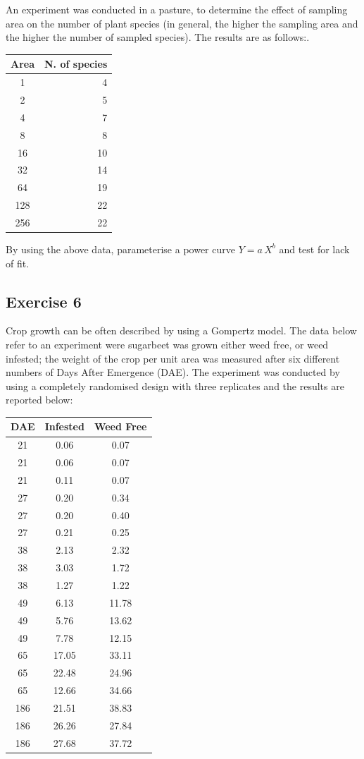 \documentclass[a4paper,12pt,oneside]{book}
\begin{document}
An experiment was conducted in a pasture, to determine the effect of sampling area on the number of plant species (in general, the higher the sampling area and the higher the number of sampled species). The results are as follows:.

\begin{longtable}[]{@{}cr@{}}
\toprule
Area & N. of species \\
\midrule
\endhead
1 & 4 \\
2 & 5 \\
4 & 7 \\
8 & 8 \\
16 & 10 \\
32 & 14 \\
64 & 19 \\
128 & 22 \\
256 & 22 \\
\bottomrule
\end{longtable}

By using the above data, parameterise a power curve \(Y = a \, X^b\) and test for lack of fit.

\hypertarget{exercise-6-1}{%
\subsection{Exercise 6}\label{exercise-6-1}}

Crop growth can be often described by using a Gompertz model. The data below refer to an experiment were sugarbeet was grown either weed free, or weed infested; the weight of the crop per unit area was measured after six different numbers of Days After Emergence (DAE). The experiment was conducted by using a completely randomised design with three replicates and the results are reported below:

\begin{longtable}[]{@{}ccc@{}}
\toprule
DAE & Infested & Weed Free \\
\midrule
\endhead
21 & 0.06 & 0.07 \\
21 & 0.06 & 0.07 \\
21 & 0.11 & 0.07 \\
27 & 0.20 & 0.34 \\
27 & 0.20 & 0.40 \\
27 & 0.21 & 0.25 \\
38 & 2.13 & 2.32 \\
38 & 3.03 & 1.72 \\
38 & 1.27 & 1.22 \\
49 & 6.13 & 11.78 \\
49 & 5.76 & 13.62 \\
49 & 7.78 & 12.15 \\
65 & 17.05 & 33.11 \\
65 & 22.48 & 24.96 \\
65 & 12.66 & 34.66 \\
186 & 21.51 & 38.83 \\
186 & 26.26 & 27.84 \\
186 & 27.68 & 37.72 \\
\bottomrule
\end{longtable}
\end{document}

